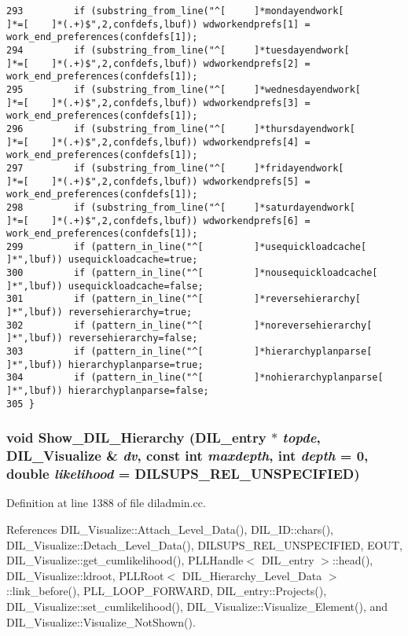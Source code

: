 \begin{verbatim}
293         if (substring_from_line("^[     ]*mondayendwork[        ]*=[    ]*(.+)$",2,confdefs,lbuf)) wdworkendprefs[1] = work_end_preferences(confdefs[1]);
294         if (substring_from_line("^[     ]*tuesdayendwork[       ]*=[    ]*(.+)$",2,confdefs,lbuf)) wdworkendprefs[2] = work_end_preferences(confdefs[1]);
295         if (substring_from_line("^[     ]*wednesdayendwork[     ]*=[    ]*(.+)$",2,confdefs,lbuf)) wdworkendprefs[3] = work_end_preferences(confdefs[1]);
296         if (substring_from_line("^[     ]*thursdayendwork[      ]*=[    ]*(.+)$",2,confdefs,lbuf)) wdworkendprefs[4] = work_end_preferences(confdefs[1]);
297         if (substring_from_line("^[     ]*fridayendwork[        ]*=[    ]*(.+)$",2,confdefs,lbuf)) wdworkendprefs[5] = work_end_preferences(confdefs[1]);
298         if (substring_from_line("^[     ]*saturdayendwork[      ]*=[    ]*(.+)$",2,confdefs,lbuf)) wdworkendprefs[6] = work_end_preferences(confdefs[1]);
299         if (pattern_in_line("^[         ]*usequickloadcache[    ]*",lbuf)) usequickloadcache=true;
300         if (pattern_in_line("^[         ]*nousequickloadcache[  ]*",lbuf)) usequickloadcache=false;
301         if (pattern_in_line("^[         ]*reversehierarchy[     ]*",lbuf)) reversehierarchy=true;
302         if (pattern_in_line("^[         ]*noreversehierarchy[   ]*",lbuf)) reversehierarchy=false;
303         if (pattern_in_line("^[         ]*hierarchyplanparse[   ]*",lbuf)) hierarchyplanparse=true;
304         if (pattern_in_line("^[         ]*nohierarchyplanparse[         ]*",lbuf)) hierarchyplanparse=false;
305 }
\end{verbatim}\normalsize 
{}
\subsubsection{\setlength{\rightskip}{0pt plus 5cm}void Show\_\-DIL\_\-Hierarchy ({\bf DIL\_\-entry} $\ast$ {\em topde}, {\bf DIL\_\-Visualize} \& {\em dv}, const int {\em maxdepth}, int {\em depth} = 0, double {\em likelihood} = DILSUPS\_\-REL\_\-UNSPECIFIED)}\label{dil2al_8hh_a311}




Definition at line 1388 of file diladmin.cc.

References DIL\_\-Visualize::Attach\_\-Level\_\-Data(), DIL\_\-ID::chars(), DIL\_\-Visualize::Detach\_\-Level\_\-Data(), DILSUPS\_\-REL\_\-UNSPECIFIED, EOUT, DIL\_\-Visualize::get\_\-cumlikelihood(), PLLHandle$<$ DIL\_\-entry $>$::head(), DIL\_\-Visualize::ldroot, PLLRoot$<$ DIL\_\-Hierarchy\_\-Level\_\-Data $>$::link\_\-before(), PLL\_\-LOOP\_\-FORWARD, DIL\_\-entry::Projects(), DIL\_\-Visualize::set\_\-cumlikelihood(), DIL\_\-Visualize::Visualize\_\-Element(), and DIL\_\-Visualize::Visualize\_\-Not\-Shown().

